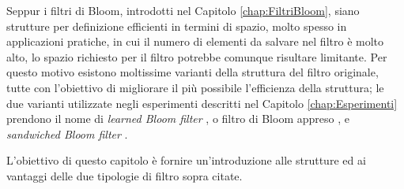 \documentclass[../../main.tex]{subfiles}
\begin{document}
    Seppur i filtri di Bloom, introdotti nel Capitolo \ref{chap:FiltriBloom}, siano strutture per definizione efficienti in termini di spazio, molto spesso in applicazioni pratiche, in cui il numero di elementi da salvare nel filtro è molto alto, lo spazio richiesto per il filtro potrebbe comunque risultare limitante. Per questo motivo esistono moltissime varianti della struttura del filtro originale, tutte con l'obiettivo di migliorare il più possibile l'efficienza della struttura; le due varianti utilizzate negli esperimenti descritti nel Capitolo \ref{chap:Esperimenti} prendono il nome di \textit{learned Bloom filter} , o filtro di Bloom appreso \cite{kraska2018case}, e \textit{sandwiched Bloom filter} \cite{10.5555/3326943.3326986}. 

    L'obiettivo di questo capitolo è fornire un'introduzione alle strutture ed ai vantaggi delle due tipologie di filtro sopra citate.
\end{document}
